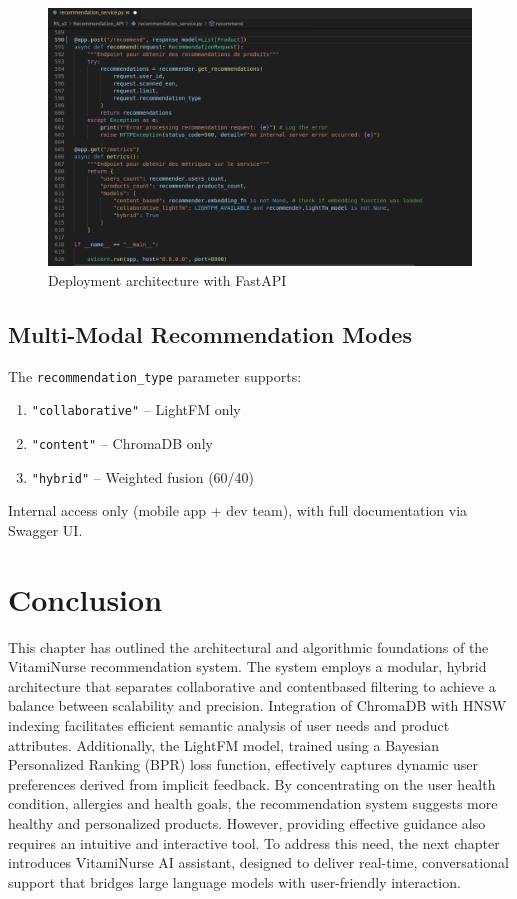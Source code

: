 \begin{figure}[H]
\centering
\includegraphics[scale=0.35]{images/deploy_RS.png}
\caption{Deployment architecture with FastAPI}
\label{fig:Deploy_RS}
\end{figure}

\subsection{Multi-Modal Recommendation Modes}
The \texttt{recommendation\_type} parameter supports:
\begin{enumerate}
    \item \texttt{"collaborative"} – LightFM only
    \item \texttt{"content"} – ChromaDB only
    \item \texttt{"hybrid"} – Weighted fusion (60/40)
\end{enumerate}

Internal access only (mobile app + dev team), with full documentation via Swagger UI.


\section*{Conclusion}
This chapter has outlined the architectural and algorithmic foundations
of the VitamiNurse recommendation system. The system employs a
modular, hybrid architecture that separates collaborative and contentbased filtering to achieve a balance between scalability and precision.
Integration of ChromaDB with HNSW indexing facilitates efficient semantic analysis of user needs and product attributes. Additionally, the
LightFM model, trained using a Bayesian Personalized Ranking (BPR)
loss function, effectively captures dynamic user preferences derived from
implicit feedback.
By concentrating on the user health condition, allergies and health goals,
the recommendation system suggests more healthy and personalized
products. However, providing effective guidance also requires an intuitive
and interactive tool. To address this need, the next chapter introduces
VitamiNurse AI assistant, designed to deliver real-time, conversational
support that bridges large language models with user-friendly interaction.